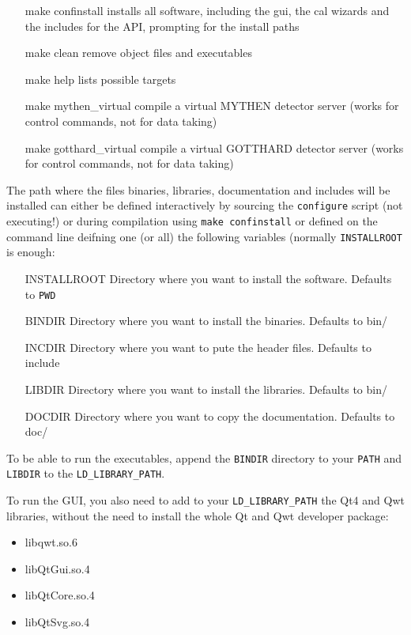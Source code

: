 \documentclass{article}
\begin{document}
\begin{itemize}
\item[make confinstall]         installs all software, including the gui, the cal wizards and the includes for the API, prompting for the install paths

\item[make clean]              remove object files and executables

\item[make help]               lists possible targets

\item[make mythen\_virtual]     compile a virtual MYTHEN detector server (works for control commands, not for data taking)

\item[make gotthard\_virtual]     compile a virtual GOTTHARD detector server (works for control commands, not for data taking)
\end{itemize}

The path where the files binaries, libraries, documentation and includes  will be installed can either be defined interactively by sourcing the  \verb=configure= script (not executing!) or during compilation using \verb=make confinstall= or defined on the command line deifning one (or all) the following variables (normally \verb=INSTALLROOT= is enough:
\begin{itemize}
\item[INSTALLROOT] Directory where you want to install the software. Defaults to \verb=PWD= 
\item[BINDIR] Directory where you want to install the binaries. Defaults to bin/
\item[INCDIR] Directory where you want to pute the header files. Defaults to include
\item[LIBDIR] Directory where you want to install the libraries. Defaults to bin/
\item[DOCDIR] Directory where you want to copy the documentation. Defaults to doc/
\end{itemize}



To be able to run the executables, append the \verb=BINDIR= directory to your \verb=PATH= and \verb=LIBDIR= to the \verb=LD_LIBRARY_PATH=.

To run the GUI, you also need to add to your \verb=LD_LIBRARY_PATH= the Qt4 and Qwt libraries, without the need to install the whole Qt and Qwt developer package:
\begin{itemize}
\item libqwt.so.6 
\item libQtGui.so.4 
\item libQtCore.so.4 
\item libQtSvg.so.4 
\end{itemize}
\end{document}
